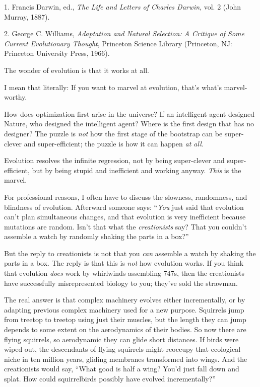 \myendsectiontext


\bigskip

{
 1. Francis Darwin, ed., \textit{The Life and Letters of Charles
Darwin}, vol. 2 (John Murray, 1887).}

{
 2. George C. Williams, \textit{Adaptation and Natural Selection: A
Critique of Some Current Evolutionary Thought}, Princeton Science
Library (Princeton, NJ: Princeton University Press, 1966).}


{
 The wonder of evolution is that it works at all. }

{
 I mean that literally: If you want to marvel at evolution,
that's what's marvel-worthy.}

{
 How does optimization first arise in the universe? If an
intelligent agent designed Nature, who designed the intelligent agent?
Where is the first design that has no designer? The puzzle is
\textit{not} how the first stage of the bootstrap can be super-clever
and super-efficient; the puzzle is how it can happen \textit{at all.}}

{
 Evolution resolves the infinite regression, not by being
super-clever and super-efficient, but by being stupid and inefficient
and working anyway. \textit{This} is the marvel.}

{
 For professional reasons, I often have to discuss the slowness,
randomness, and blindness of evolution. Afterward someone says:
``\textit{You} just said that evolution
can't plan simultaneous changes, and that evolution is
very inefficient because mutations are random. Isn't
that what the \textit{creationists} say? That you
couldn't assemble a watch by randomly shaking the parts
in a box?''}

{
 But the reply to creationists is not that you \textit{can}
assemble a watch by shaking the parts in a box. The reply is that this
is \textit{not} how evolution works. If you think that evolution
\textit{does} work by whirlwinds assembling 747s, then the creationists
have successfully misrepresented biology to you;
they've sold the strawman.}

{
 The real answer is that complex machinery evolves either
incrementally, or by adapting previous complex machinery used for a new
purpose. Squirrels jump from treetop to treetop using just their
muscles, but the length they can jump depends to some extent on the
aerodynamics of their bodies. So now there are flying squirrels, so
aerodynamic they can glide short distances. If birds were wiped out,
the descendants of flying squirrels might reoccupy that ecological
niche in ten million years, gliding membranes transformed into wings.
And the creationists would say, ``What good is half a
wing? You'd just fall down and splat. How could
squirrelbirds possibly have evolved incrementally?''}

